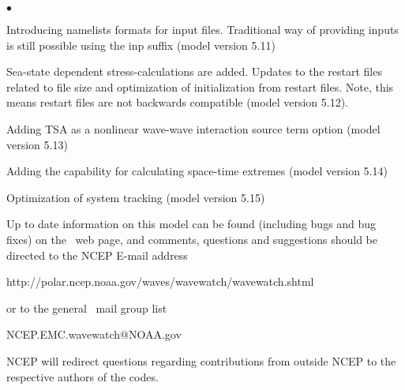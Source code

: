 \begin{list}{$\bullet$}{\rightmargin 5mm \parsep 0mm \itemsep 0mm}
\item Introducing namelists formats for input files. Traditional way of providing inputs is still possible using the inp suffix (model version 5.11)

\item Sea-state dependent stress-calculations are added.  Updates to the restart files related to file size and optimization of initialization from restart files. Note, this means restart files are not backwards compatible  (model version 5.12).

\item Adding TSA as a nonlinear wave-wave interaction source term option (model version 5.13) 

\item Adding the capability for calculating space-time extremes (model version 5.14)

\item Optimization of system tracking (model version 5.15)

\end{list}

\vspace{\baselineskip} \noindent 
Up to date information on this model can be found (including bugs and bug
fixes) on the \ws\ web page, and comments, questions and suggestions should be
directed to the NCEP E-mail address

\begin{center}
http://polar.ncep.noaa.gov/waves/wavewatch/wavewatch.shtml
\end{center}

\noindent
or to the general \ws\ mail group list

\begin{center}
NCEP.EMC.wavewatch@NOAA.gov
\end{center}

\noindent
NCEP will redirect questions regarding contributions from outside NCEP to the
respective authors of the codes.
